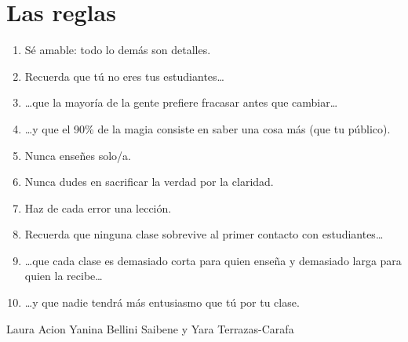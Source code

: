 \chapter*{Las reglas}

\begin{enumerate}

\item Sé amable: todo lo demás son detalles.\\

\item Recuerda que tú no eres tus estudiantes{\ldots}\\

\item {\ldots}que la mayoría de la gente prefiere fracasar antes que cambiar{\ldots}\\

\item {\ldots}y que el 90\% de la magia consiste en saber una cosa más (que tu público).\\

\item Nunca enseñes solo/a.\\

\item Nunca dudes en sacrificar la verdad por la claridad.\\

\item Haz de cada error una lección.\\

\item Recuerda que ninguna clase sobrevive al primer contacto con estudiantes{\ldots}\\

\item {\ldots}que cada clase es demasiado corta para quien enseña y demasiado larga para quien la recibe{\ldots}\\

\item {\ldots}y que nadie tendrá más entusiasmo que tú por tu clase.

\end{enumerate}

\begin{reviewer}
{Laura Acion}
{Yanina Bellini Saibene y Yara Terrazas-Carafa}
\end{reviewer}
